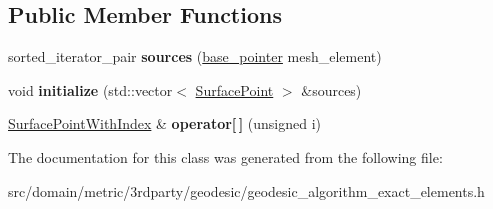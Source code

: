 \subsection*{Public Member Functions}
\begin{DoxyCompactItemize}
\item 
\hypertarget{classgeodesic_1_1_sorted_sources_a3efe88b6f04433a9d209f6f97266a918}{}sorted\+\_\+iterator\+\_\+pair {\bfseries sources} (\hyperlink{classgeodesic_1_1_mesh_element_base}{base\+\_\+pointer} mesh\+\_\+element)\label{classgeodesic_1_1_sorted_sources_a3efe88b6f04433a9d209f6f97266a918}

\item 
\hypertarget{classgeodesic_1_1_sorted_sources_add01e196aa09050946161d5ea1921966}{}void {\bfseries initialize} (std\+::vector$<$ \hyperlink{classgeodesic_1_1_surface_point}{Surface\+Point} $>$ \&sources)\label{classgeodesic_1_1_sorted_sources_add01e196aa09050946161d5ea1921966}

\item 
\hypertarget{classgeodesic_1_1_sorted_sources_ada5e9cd4793cf970284c7b6c10cd29d3}{}\hyperlink{classgeodesic_1_1_surface_point_with_index}{Surface\+Point\+With\+Index} \& {\bfseries operator\mbox{[}$\,$\mbox{]}} (unsigned i)\label{classgeodesic_1_1_sorted_sources_ada5e9cd4793cf970284c7b6c10cd29d3}

\end{DoxyCompactItemize}


The documentation for this class was generated from the following file\+:\begin{DoxyCompactItemize}
\item 
src/domain/metric/3rdparty/geodesic/geodesic\+\_\+algorithm\+\_\+exact\+\_\+elements.\+h\end{DoxyCompactItemize}
